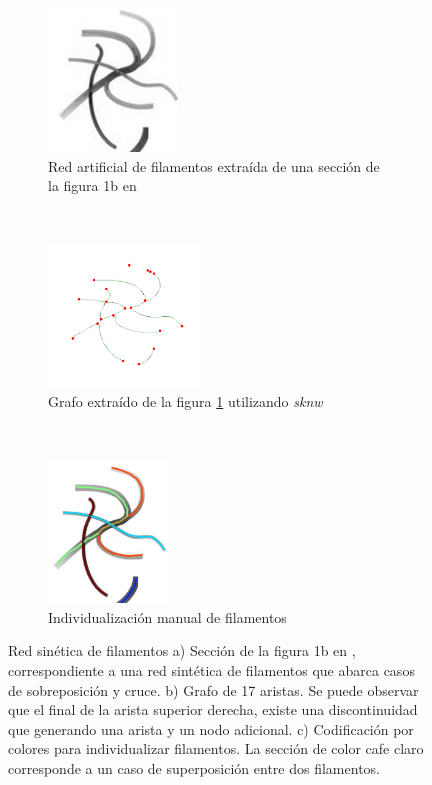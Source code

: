  \begin{figure}[h!]
    \centering
    \begin{subfigure}[t]{0.3\textwidth}
        \centering
        \includegraphics[height=1.5in]{benchImages/define-weighted-4.png}
        \caption{Red artificial de filamentos extra\'ida de una secci\'on de la figura 1b en \cite{breuer2015define}}
        \label{fig:synth-Define-1b-original}
    \end{subfigure}%
    ~ 
    \begin{subfigure}[t]{0.3\textwidth}
        \centering
        \includegraphics[height=1.5in]{benchImages/define-weighted-4_inv_graph_labeled_thick.png}
        \caption{Grafo extra\'ido de la figura \ref{fig:synth-Define-1b-original} utilizando {\it sknw}}
        \label{fig:synth-Define-1b-graph}
    \end{subfigure}
    ~ 
    \begin{subfigure}[t]{0.3\textwidth}
        \centering
        \includegraphics[height=1.5in]{benchImages/define-weighted-4-groundTruth.png}
        \caption{Individualizaci\'on manual de filamentos}
        \label{fig:synth-Define-1b-graph-gt}
    \end{subfigure}
    \caption{Red sin\'etica de filamentos a) Secci\'on de la figura 1b en \cite{breuer2015define}, correspondiente a una red sint\'etica de filamentos que abarca casos de sobreposici\'on y cruce. b) Grafo de 17 aristas. Se puede observar que el final de la arista superior derecha, existe una discontinuidad que generando una arista y un nodo adicional. c) Codificaci\'on por colores para individualizar filamentos. La secci\'on de color cafe claro corresponde a un caso de superposici\'on entre dos filamentos.}
    \label{fig:synth-Define-1b}
\end{figure}

